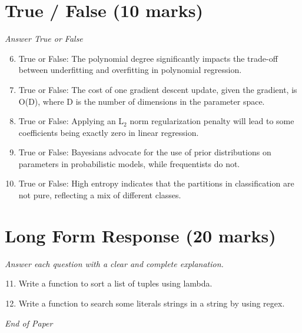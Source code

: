\documentclass[12pt]{article}
\begin{document}
\section*{True / False (10 marks)}
\textit{Answer True or False}
\begin{enumerate}[label=\arabic*.]
\setcounter{enumi}{5}
\item True or False: The polynomial degree significantly impacts the trade-off between underfitting and overfitting in polynomial regression.
\item True or False: The cost of one gradient descent update, given the gradient, is O(D), where D is the number of dimensions in the parameter space.
\item True or False: Applying an L$_{2}$ norm regularization penalty will lead to some coefficients being exactly zero in linear regression.
\item True or False: Bayesians advocate for the use of prior distributions on parameters in probabilistic models, while frequentists do not.
\item True or False: High entropy indicates that the partitions in classification are not pure, reflecting a mix of different classes.
\end{enumerate}

\section*{Long Form Response (20 marks)}
\textit{Answer each question with a clear and complete explanation.}
\begin{enumerate}[label=\arabic*.]
\setcounter{enumi}{10}
\item Write a function to sort a list of tuples using lambda.
\item Write a function to search some literals strings in a string by using regex.
\end{enumerate}

\vfill
\noindent\textit{End of Paper}
\end{document}
